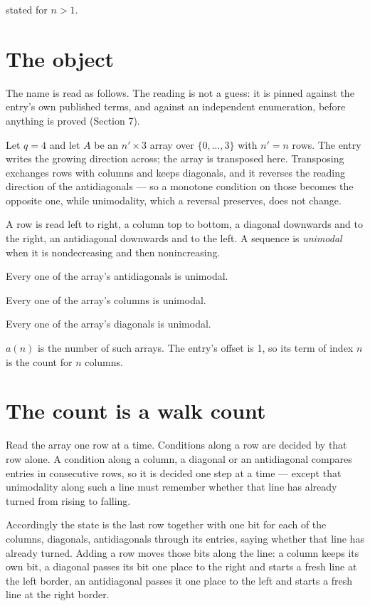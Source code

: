 \documentclass[11pt]{article}
\theoremstyle{definition}
\begin{document}
stated for $n > 1$.

\section{The object}

The name is read as follows. The reading is not a guess: it is pinned against the entry's own published terms, and against an independent enumeration, before anything is proved (Section 7).

Let $q = 4$ and let $A$ be an $n' \times 3$ array over $\{0,\dots,3\}$ with $n' = n$ rows. The entry writes the growing direction across; the array is transposed here. Transposing exchanges rows with columns and keeps diagonals, and it reverses the reading direction of the antidiagonals --- so a monotone condition on those becomes the opposite one, while unimodality, which a reversal preserves, does not change.

A row is read left to right, a column top to bottom, a diagonal downwards and to the right, an antidiagonal downwards and to the left. A sequence is {\itshape unimodal} when it is nondecreasing and then nonincreasing.

Every one of the array's antidiagonals is unimodal.

Every one of the array's columns is unimodal.

Every one of the array's diagonals is unimodal.

$a(n)$ is the number of such arrays. The entry's offset is 1, so its term of index $n$ is the count for $n$ columns.

\section{The count is a walk count}

Read the array one row at a time. Conditions along a row are decided by that row alone. A condition along a column, a diagonal or an antidiagonal compares entries in consecutive rows, so it is decided one step at a time --- except that unimodality along such a line must remember whether that line has already turned from rising to falling.

Accordingly the state is the last row together with one bit for each of the columns, diagonals, antidiagonals through its entries, saying whether that line has already turned. Adding a row moves those bits along the line: a column keeps its own bit, a diagonal passes its bit one place to the right and starts a fresh line at the left border, an antidiagonal passes it one place to the left and starts a fresh line at the right border.
\end{document}
